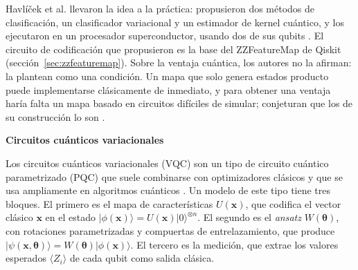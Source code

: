 Havlíček et al. llevaron la idea a la práctica: propusieron dos métodos de clasificación, un clasificador variacional y un estimador de kernel cuántico, y los ejecutaron en un procesador superconductor, usando dos de sus qubits \cite{havlicek2019supervised}. El circuito de codificación que propusieron es la base del ZZFeatureMap de Qiskit (sección~\ref{sec:zzfeaturemap}).
Sobre la ventaja cuántica, los autores no la afirman: la plantean como una condición. Un mapa que solo genera estados producto puede implementarse clásicamente de inmediato, y para obtener una ventaja haría falta un mapa basado en circuitos difíciles de simular; conjeturan que los de su construcción lo son \cite{havlicek2019supervised}.

\textbf{Circuitos cuánticos variacionales}

Los circuitos cuánticos variacionales (VQC) son un tipo de circuito cuántico parametrizado (PQC) que suele combinarse con optimizadores clásicos y que se usa ampliamente en algoritmos cuánticos \cite{Long2025HybridQCQ}.
Un modelo de este tipo tiene tres bloques. El primero es el mapa de características $U(\mathbf{x})$, que codifica el vector clásico $\mathbf{x}$ en el estado $|\phi(\mathbf{x})\rangle = U(\mathbf{x})|0\rangle^{\otimes n}$. El segundo es el \textit{ansatz} $W(\boldsymbol{\theta})$, con rotaciones parametrizadas y compuertas de entrelazamiento, que produce $|\psi(\mathbf{x},\boldsymbol{\theta})\rangle = W(\boldsymbol{\theta})|\phi(\mathbf{x})\rangle$. El tercero es la medición, que extrae los valores esperados $\langle Z_i \rangle$ de cada qubit como salida clásica.

